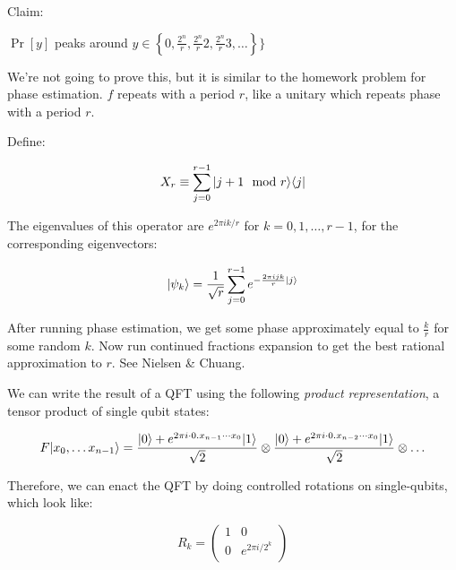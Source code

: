 \documentclass[12pt]{article}
\begin{document}
Claim:

$\Pr[y]$ peaks around $y \in \left\{ 0, \frac{2^n}{r}, \frac{2^n}{r}2,
\frac{2^n}{r}3, \ldots \right\} \}$

We're not going to prove this, but it is similar to the homework problem for
phase estimation. $f$ repeats with a period $r$, like a unitary which
repeats phase with a period $r$.

Define:

\begin{displaymath}
X_r \equiv \sum_{j=0}^{r-1} |j+1 \mod r \rangle \langle j |
\end{displaymath}

The eigenvalues of this operator are $e^{2\pi i k / r}$ for
$k = 0, 1, \ldots, r-1$, for the corresponding eigenvectors:

\begin{displaymath}
|\psi_k \rangle = \frac{1}{\sqrt{r}} \sum_{j=0}^{r-1} e^{-\frac{2\pi i j k}{r}|j \rangle}
\end{displaymath}

After running phase estimation, we get some phase approximately equal to
$\frac{k}{r}$ for some random $k$. Now run continued fractions expansion to
get the best rational approximation to $r$.
See Nielsen \& Chuang.

We can write the result of a QFT using the
following \emph{product representation}, a tensor product of single qubit
states:

\begin{displaymath}
F|x_0, \ldots x_{n-1} \rangle =
\frac{|0 \rangle + e^{2\pi i \cdot 0.x_{n-1}\cdots x_0} |1 \rangle}{\sqrt{2}} \otimes
\frac{|0 \rangle + e^{2\pi i \cdot 0.x_{n-2}\cdots x_0} |1 \rangle}{\sqrt{2}} \otimes
\ldots
\end{displaymath}

Therefore, we can enact the QFT by doing controlled rotations on single-qubits,
which look like:

\begin{displaymath}
R_k = 
 \left(
  \begin{array}{cc}
    1 & 0 \\
    0 & e^{2\pi i / 2^k} \\
  \end{array} \right)
\end{displaymath}
\end{document}
